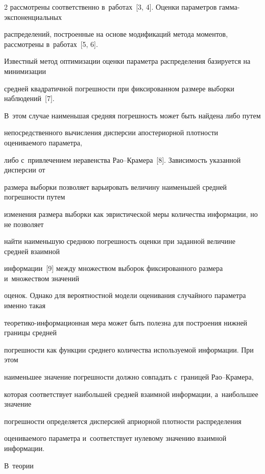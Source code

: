 \begin{multicols}{2}
рас\-смот\-ре\-ны соответственно в~работах~[3, 4]. Оценки параметров гам\-ма-экс\-по\-нен\-ци\-аль\-ных 


распределений, по\-стро\-ен\-ные на основе модификаций метода моментов, рассмотрены в~работах~[5, 6].





Известный метод оптимизации оценки параметра распределения базируется на минимизации 


средней квадратичной по\-греш\-ности при фиксированном размере выборки наблюдений~[7]. 


В~этом случае наименьшая сред\-няя по\-греш\-ность может быть найдена либо путем 


непосредственного вы\-чис\-ле\-ния дисперсии апостериорной плот\-ности оце\-ни\-ва\-емо\-го па\-ра\-мет\-ра, 


либо с~привлечением неравенства Рао--Кра\-ме\-ра~[8]. За\-ви\-си\-мость указанной дисперсии от 


размера выборки позволяет варьировать величину наименьшей сред\-ней по\-греш\-ности путем 


изменения размера выборки как эвристической меры количества информации, но не позволяет 


найти наименьшую среднюю погрешность оценки при заданной величине средней взаимной 


информации~[9] между множеством выборок фиксированного размера и~множеством значений 


оценок. Однако для вероятностной модели оценивания случайного параметра именно такая 


тео\-ре\-ти\-ко-ин\-фор\-ма\-ци\-он\-ная мера может быть полезна для построения ниж\-ней границы средней 


погрешности как функции среднего количества ис\-поль\-зу\-емой информации. При этом 


наименьшее значение по\-греш\-ности долж\-но совпадать с~границей Рао--Кра\-ме\-ра, 


которая соответствует наибольшей сред\-ней взаимной информации, а~наибольшее значение 


 по\-греш\-ности определяется дис\-пер\-си\-ей априорной плот\-ности распределения 


оце\-ни\-ва\-емо\-го па\-ра\-мет\-ра и~соответствует нулевому значению взаимной информации. 





В~теории 



\end{multicols}
